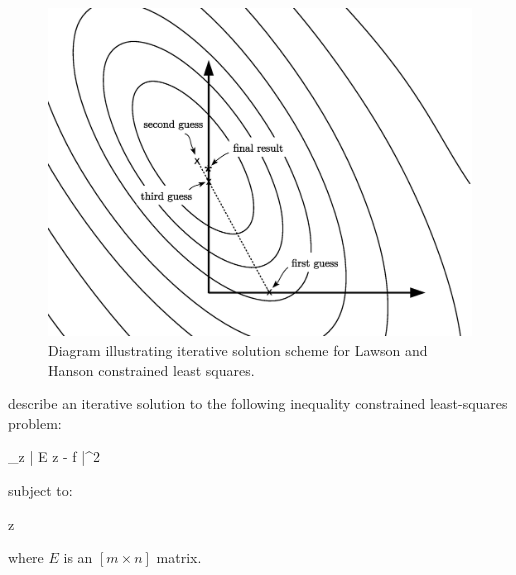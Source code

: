 \label{Lawson_Hanson}

\begin{figure}
  \includegraphics[width=1\textwidth]{Lawson_Hanson}
	\caption{Diagram illustrating iterative solution scheme for Lawson and Hanson constrained least squares.}\label{Lawson_Hanson_fig}
\end{figure}

\citet{Lawson_Hanson1995} describe an iterative solution to the following
inequality constrained least-squares problem:
\begin{eqnnon}
	\min_{\vec z} | E \vec z - \vec f |^2
\end{eqnnon}
subject to:
\begin{eqnnon}
	\vec z \ge {}
\end{eqnnon}
where $E$ is an $[m \times n]$ matrix.

